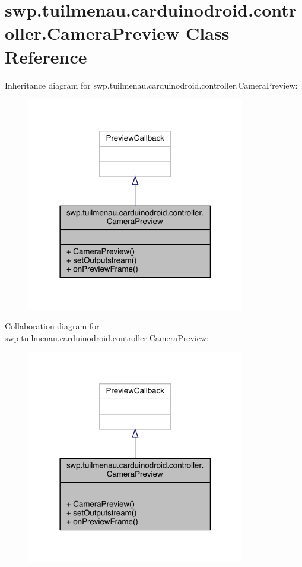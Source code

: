 \hypertarget{classswp_1_1tuilmenau_1_1carduinodroid_1_1controller_1_1_camera_preview}{}\section{swp.\+tuilmenau.\+carduinodroid.\+controller.\+Camera\+Preview Class Reference}
\label{classswp_1_1tuilmenau_1_1carduinodroid_1_1controller_1_1_camera_preview}


Inheritance diagram for swp.\+tuilmenau.\+carduinodroid.\+controller.\+Camera\+Preview\+:
\nopagebreak
\begin{figure}[H]
\begin{center}
\leavevmode
\includegraphics[width=270pt]{classswp_1_1tuilmenau_1_1carduinodroid_1_1controller_1_1_camera_preview__inherit__graph}
\end{center}
\end{figure}


Collaboration diagram for swp.\+tuilmenau.\+carduinodroid.\+controller.\+Camera\+Preview\+:
\nopagebreak
\begin{figure}[H]
\begin{center}
\leavevmode
\includegraphics[width=270pt]{classswp_1_1tuilmenau_1_1carduinodroid_1_1controller_1_1_camera_preview__coll__graph}
\end{center}
\end{figure}
